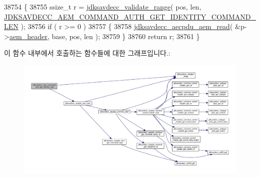 \begin{DoxyCode}
38754 \{
38755     ssize\_t r = \hyperlink{group__util_ga9c02bdfe76c69163647c3196db7a73a1}{jdksavdecc\_validate\_range}( pos, len, 
      \hyperlink{group__command__auth__get__identity_ga6a7075537cb3a9cc61c022594fc5e815}{JDKSAVDECC\_AEM\_COMMAND\_AUTH\_GET\_IDENTITY\_COMMAND\_LEN} );
38756     \textcolor{keywordflow}{if} ( r >= 0 )
38757     \{
38758         \hyperlink{group__aecpdu__aem_gae2421015dcdce745b4f03832e12b4fb6}{jdksavdecc\_aecpdu\_aem\_read}( &p->\hyperlink{structjdksavdecc__aem__command__auth__get__identity_ae1e77ccb75ff5021ad923221eab38294}{aem\_header}, base, pos, len );
38759     \}
38760     \textcolor{keywordflow}{return} r;
38761 \}
\end{DoxyCode}


이 함수 내부에서 호출하는 함수들에 대한 그래프입니다.\+:
\nopagebreak
\begin{figure}[H]
\begin{center}
\leavevmode
\includegraphics[width=350pt]{group__command__auth__get__identity_ga68e9aa18961717c072d7f3c92a72297a_cgraph}
\end{center}
\end{figure}


